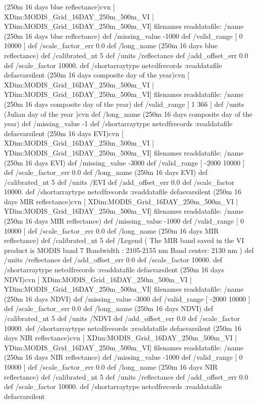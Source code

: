 (250m 16 days blue reflectance)cvn{
[ XDim:MODIS_Grid_16DAY_250m_500m_VI | YDim:MODIS_Grid_16DAY_250m_500m_VI] filenames readdatafile:
/name (250m 16 days blue reflectance) def
 /missing_value -1000 def
 /valid_range [ 0 10000 ] def
 /scale_factor_err 0.0 def
 /long_name (250m 16 days blue reflectance) def
 /calibrated_nt 5 def
 /units /reflectance def
 /add_offset_err 0.0 def
 /scale_factor 10000. def
 /shortarraytype netcdfrecords :readdatafile
}defasvarsilent
 (250m 16 days composite day of the year)cvn{
[ XDim:MODIS_Grid_16DAY_250m_500m_VI | YDim:MODIS_Grid_16DAY_250m_500m_VI] filenames readdatafile:
/name (250m 16 days composite day of the year) def
 /valid_range [ 1 366 ] def
 /units (Julian day of the year )cvn def
 /long_name (250m 16 days composite day of the year) def
 /missing_value -1 def
 /shortarraytype netcdfrecords :readdatafile
}defasvarsilent
 (250m 16 days EVI)cvn{
[ XDim:MODIS_Grid_16DAY_250m_500m_VI | YDim:MODIS_Grid_16DAY_250m_500m_VI] filenames readdatafile:
/name (250m 16 days EVI) def
 /missing_value -3000 def
 /valid_range [ -2000 10000 ] def
 /scale_factor_err 0.0 def
 /long_name (250m 16 days EVI) def
 /calibrated_nt 5 def
 /units /EVI def
 /add_offset_err 0.0 def
 /scale_factor 10000. def
 /shortarraytype netcdfrecords :readdatafile
}defasvarsilent
 (250m 16 days MIR reflectance)cvn{
[ XDim:MODIS_Grid_16DAY_250m_500m_VI | YDim:MODIS_Grid_16DAY_250m_500m_VI] filenames readdatafile:
/name (250m 16 days MIR reflectance) def
 /missing_value -1000 def
 /valid_range [ 0 10000 ] def
 /scale_factor_err 0.0 def
 /long_name (250m 16 days MIR reflectance) def
 /calibrated_nt 5 def
 /Legend (
	 The MIR band saved in the VI product is MODIS band 7
		 Bandwidth : 2105-2155 nm
		 Band center: 2130 nm
) def
 /units /reflectance def
 /add_offset_err 0.0 def
 /scale_factor 10000. def
 /shortarraytype netcdfrecords :readdatafile
}defasvarsilent
 (250m 16 days NDVI)cvn{
[ XDim:MODIS_Grid_16DAY_250m_500m_VI | YDim:MODIS_Grid_16DAY_250m_500m_VI] filenames readdatafile:
/name (250m 16 days NDVI) def
 /missing_value -3000 def
 /valid_range [ -2000 10000 ] def
 /scale_factor_err 0.0 def
 /long_name (250m 16 days NDVI) def
 /calibrated_nt 5 def
 /units /NDVI def
 /add_offset_err 0.0 def
 /scale_factor 10000. def
 /shortarraytype netcdfrecords :readdatafile
}defasvarsilent
 (250m 16 days NIR reflectance)cvn{
[ XDim:MODIS_Grid_16DAY_250m_500m_VI | YDim:MODIS_Grid_16DAY_250m_500m_VI] filenames readdatafile:
/name (250m 16 days NIR reflectance) def
 /missing_value -1000 def
 /valid_range [ 0 10000 ] def
 /scale_factor_err 0.0 def
 /long_name (250m 16 days NIR reflectance) def
 /calibrated_nt 5 def
 /units /reflectance def
 /add_offset_err 0.0 def
 /scale_factor 10000. def
 /shortarraytype netcdfrecords :readdatafile
}defasvarsilent
